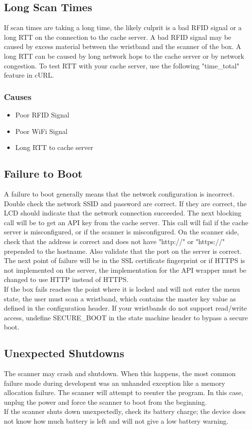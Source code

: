 \documentclass{article}
\begin{document}
\subsection{Long Scan Times}
If scan times are taking a long time, the likely culprit is a bad RFID signal or a long RTT on the connection to the cache server.  A bad RFID signal may be caused by excess material between the wristband and the scanner of the box.  A long RTT can be caused by long network hops to the cache server or by network congestion.  To test RTT with your cache server, use the following "time\_total" feature in cURL. 
\subsubsection{Causes}
\begin{itemize}
	\item Poor RFID Signal
	\item Poor WiFi Signal
	\item Long RTT to cache server
\end{itemize}

\subsection{Failure to Boot}
A failure to boot generally means that the network configuration is incorrect.  Double check the network SSID and password are correct.  If they are correct, the LCD should indicate that the network connection succeeded.  The next blocking call will be to get an API key from the cache server.  This call will fail if the cache server is misconfigured, or if the scanner is misconfigured.  On the scanner side, check that the address is correct and does not have "http://" or "https://" prepended to the hostname.  Also validate that the port on the server is correct.  The next point of failure will be in the SSL certificate fingerprint or if HTTPS is not implemented on the server, the implementation for the API wrapper must be changed to use HTTP instead of HTTPS.  \\
If the box fails reaches the point where it is locked and will not enter the menu state, the user must scan a wristband, which contains the master key value as defined in the configuration header.  If your wristbands do not support read/write access, undefine SECURE\_BOOT in the state machine header to bypass a secure boot.  

\subsection{Unexpected Shutdowns}
The scanner may crash and shutdown.  When this happens, the most common failure mode during developent was an unhanded exception like a memory allocation failure.  The scanner will attempt to reenter the program.  In this case, unplug the power and force the scanner to boot from the beginning.  \\
If the scanner shuts down unexpectedly, check its battery charge; the device does not know how much battery is left and will not give a low battery warning.  
\end{document}
